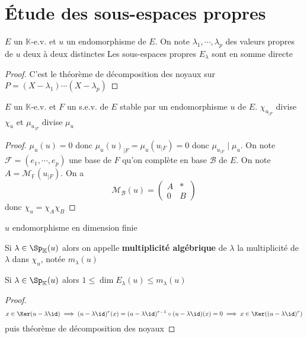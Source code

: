 \section{Étude des sous-espaces propres}

\begin{prop}
    \Hyp $E$ un $\mathbb K$-e.v. et $u$ un endomorphisme de $E$. On note $\lambda_1, \cdots, \lambda_p$ des valeurs propres de $u$ deux à deux distinctes
    \Conc Les sous-espaces propres $E_\lambda$ sont en somme directe
\end{prop}

\begin{proof}
    C'est le théorème de décomposition des noyaux sur $P=(X-\lambda_1)\cdots (X-\lambda_p)$
\end{proof}

\begin{prop}
    \Hyp $E$ un $\mathbb K$-e.v. et $F$ un s.e.v. de $E$ stable par un endomorphisme $u$ de $E$.
    \Conc $\chi_{u_{|F}}$ divise $\chi_u$ et $\mu_{u_{|F}}$ divise $\mu_u$
\end{prop}

\begin{proof}
    $\mu_u(u)=0$ donc $\mu_u(u)_{|F} =\mu_u(u_{|F})=0$ donc $\mu_{u_{|F}} \;|\;\mu_u$. On note $\mathcal F=(e_1, \cdots , e_p)$ une base de $F$ qu'on complète en base $\mathcal B$ de $E$. On note $A=\mathcal M_{\mathbb F}(u_{|F})$. On a \[
        \mathcal M_{\mathcal B}(u)= \left( \begin{array}{c|c}
                 A & * \\ 
                \hline 0 & B
        \end{array} \right)
    \]
    donc $\chi_{u}=\chi_A\chi_B$
\end{proof}

\begin{thmdef}
    \Hyp $u$ endomorphisme en dimension finie
    \begin{concenum}
    \item Si $\lambda\in\Sp_{\mathbb K}(u)$ alors on appelle \textbf{multiplicité algébrique} de $\lambda$ la multiplicité de $\lambda$ dans $\chi_u$, notée $m_\lambda(u)$
    \item Si $\lambda\in\Sp_{\mathbb K}(u)$ alors $1\leq \dim E_{\lambda}(u)\leq m_\lambda(u)$
    \end{concenum}
\end{thmdef}

\begin{proof}
    \[x\in \Ker (u-\lambda\id)\implies  (u-\lambda\id)^r(x)=(u-\lambda\id)^{r-1}\circ (u-\lambda\id)(x)=0\implies x\in \Ker((u-\lambda\id)^r)\] puis théorème de décomposition des noyaux
\end{proof}

